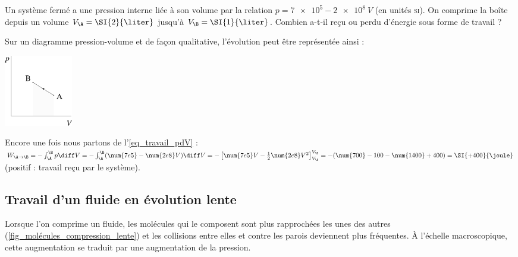 		\begin{anexample}
			Un système fermé a une pression interne liée à son volume par la relation $p = \num{7e5} - \num{2e8} \ V$ (en unités \textsc{si}). On comprime la boîte depuis un volume $V_\A = \SI{2}{\liter}$ jusqu’à $V_\B = \SI{1}{\liter}$. Combien a-t-il reçu ou perdu d’énergie sous forme de travail ?
				\begin{answer}
						Sur un diagramme pression-volume et de façon qualitative, l’évolution peut être représentée ainsi :
							\begin{center}
								\includegraphics[width=3cm]{images/exe_pv_prop.png}
							\end{center}
					Encore une fois nous partons de l’\cref{eq_travail_pdV} : $W_{\A\to\B} = - \int_\A^\B p \diff V = - \int_\A^\B (\num{7e5} - \num{2e8} V) \diff V = - \left[\num{7e5}V - \frac{1}{2}\num{2e8} V^2\right]_{V_\A}^{V_\B } = - (\num{700} - 100 - \num{1400} + 400) = \SI{+400}{\joule}$ (positif : travail reçu par le système).
				\end{answer}
		\end{anexample}
		

\onlyframabook{\clearpage}%
	\subsection{Travail d’un fluide en évolution lente}

		Lorsque l’on comprime un fluide, les molécules qui le composent sont plus rapprochées les unes des autres (\cref{fig_molécules_compression_lente}) et les collisions entre elles et contre les parois deviennent plus fréquentes. À l’échelle macroscopique, cette augmentation se traduit par une augmentation de la pression.
		
